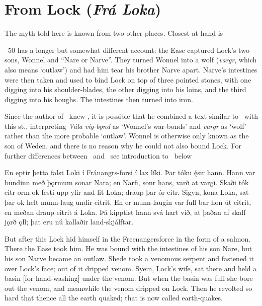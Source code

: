 \section{From Lock (\emph{Frá Loka})}

The myth told here is known from two other places. Closest at hand is \Voluspa\

\Gylfaginning\ 50 has a longer but somewhat different account: the Ease captured Lock’s two sons, Wonnel and “Nare or Narve”. They turned Wonnel into a wolf (\emph{vargr}, which also means ‘outlaw’) and had him tear his brother Narve apart. Narve’s intestines were then taken and used to bind Lock on top of three pointed stones, with one digging into his shoulder-blades, the other digging into his loins, and the third digging into his houghs. The intestines then turned into iron.

Since the author of \Gylfaginning\ knew \Voluspa, it is possible that he combined a text similar to \FraLoka\ with this st., interpreting \emph{Vála víg-bǫnd} as ‘Wonnel’s war-bonds’ and \emph{vargr} as ‘wolf’ rather than the more probable ‘outlaw’. Wonnel is otherwise only known as the son of Weden, and there is no reason why he could not also bound Lock. For further differences between \Gylfaginning\ and \FraLoka\ see introduction to \FraLoka\ below

\sectionline

\bpg\bpa En eptir þetta falst Loki í Fránangrs-forsi í lax líki. Þar tóku ę́sir hann. Hann var bundinn með þǫrmum sonar Nara; en Narfi, sonr hans, varð at vargi. Skaði tók eitr-orm ok festi upp yfir and-lit Loka; draup þar ór eitr. Sigyn, kona Loka, sat þar ok helt munn-laug undir eitrit. En er munn-laugin var full bar hon út eitrit, en meðan draup eitrit á Loka. Þá kipptist hann svá hart við, at þaðan af skalf jǫrð ǫll; þat eru nú kallaðir land-skjálftar.\epa

\bpb But after this Lock hid himself in the Freenangersforce in the form of a salmon. There the Ease took him. He was bound with the intestines of his son Nare, but his son Narve became an outlaw. Shede took a venomous serpent and fastened it over Lock’s face; out of it dripped venom. Syein, Lock’s wife, sat there and held a basin [for hand-washing] under the venom. But when the basin was full she bore out the venom, and meanwhile the venom dripped on Lock. Then he revolted so hard that thence all the earth quaked; that is now called earth-quakes.\epb\epg
